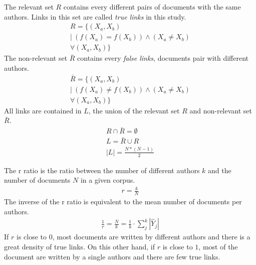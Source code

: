 \begin{definition}
  The relevant set $R$ contains every different pairs of documents with the same authors.
  Links in this set are called \textit{true links} in this study.
  \begin{gather*}
    R = \{(X_a, X_b)\ \\
    |\ \left( f(X_a) = f(X_b) \right) \land \left(X_a \neq X_b \right) \\
    \forall (X_a, X_b) \}
  \end{gather*}
  The non-relevant set $\bar{R}$ contains every \textit{false links}, documents pair with different authors.
  \begin{gather*}
    \bar{R} = \{(X_a, X_b)\ \\
    |\ \left( f(X_a) \neq f(X_b) \right) \land \left(X_a \neq X_b \right) \\
    \forall (X_a, X_b)\}
  \end{gather*}
  All links are contained in $L$, the union of the relevant set $R$ and non-relevant set $\bar{R}$.
  \begin{gather*}
    R \cap \bar{R} = \emptyset \\
    L = \bar{R} \cup R \\
    |L| = \frac{N * (N-1)}{2}
  \end{gather*}
\end{definition}

\begin{definition}
  The r ratio is the ratio between the number of different authors $k$ and the number of documents $N$ in a given corpus.
  \begin{gather*}
    r = \frac{k}{N}
  \end{gather*}
  The inverse of the r ratio is equivalent to the mean number of documents per authors.
  \begin{gather*}
    \frac{1}{r} = \frac{N}{k} = \frac{1}{k} \cdot \sum_{j}^{k} |\hat{Y}_j|
  \end{gather*}
  If $r$ is close to $0$, most documents are written by different authors and there is a great density of true links.
  On this other hand, if $r$ is close to $1$, most of the document are written by a single authors and there are few true links.
\end{definition}

